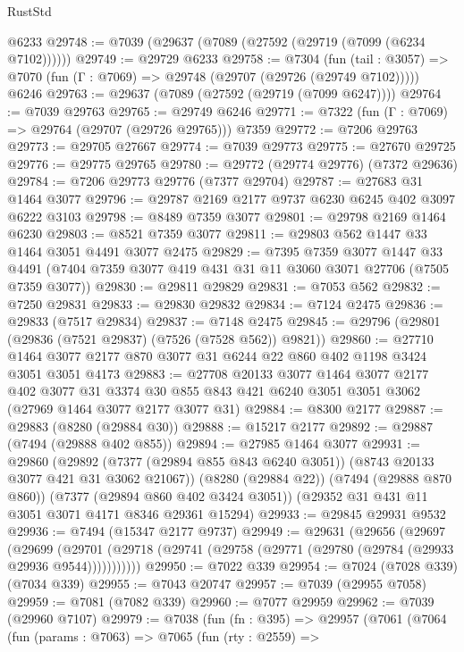 \begin{lexlean}{RustStd}
\begin{coremodule}
    @6233
@29748 := @7039 (@29637 (@7089 (@27592 (@29719 (@7099 (@6234 @7102))))))
@29749 := @29729 @6233
@29758 := @7304
    (fun (tail : @3057) => @7070 (fun (Γ : @7069) => @29748 (@29707 (@29726 (@29749 @7102)))))
    @6246
@29763 := @29637 (@7089 (@27592 (@29719 (@7099 @6247))))
@29764 := @7039 @29763
@29765 := @29749 @6246
@29771 := @7322 (fun (Γ : @7069) => @29764 (@29707 (@29726 @29765))) @7359
@29772 := @7206 @29763
@29773 := @29705 @27667
@29774 := @7039 @29773
@29775 := @27670 @29725
@29776 := @29775 @29765
@29780 := @29772 (@29774 @29776) (@7372 @29636)
@29784 := @7206 @29773 @29776 (@7377 @29704)
@29787 := @27683 @31 @1464 @3077
@29796 := @29787 @2169 @2177 @9737 @6230 @6245 @402 @3097 @6222 @3103
@29798 := @8489 @7359 @3077
@29801 := @29798 @2169 @1464 @6230
@29803 := @8521 @7359 @3077
@29811 := @29803 @562 @1447 @33 @1464 @3051 @4491 @3077 @2475
@29829 := @7395
    @7359
    @3077
    @1447
    @33
    @4491
    (@7404 @7359 @3077 @419 @431 @31 @11 @3060 @3071 @27706 (@7505 @7359 @3077))
@29830 := @29811 @29829
@29831 := @7053 @562
@29832 := @7250 @29831
@29833 := @29830 @29832
@29834 := @7124 @2475
@29836 := @29833 (@7517 @29834)
@29837 := @7148 @2475
@29845 := @29796 (@29801 (@29836 (@7521 @29837) (@7526 (@7528 @562)) @9821))
@29860 := @27710 @1464 @3077 @2177 @870 @3077 @31 @6244 @22 @860 @402 @1198 @3424 @3051 @3051 @4173
@29883 := @27708
    @20133
    @3077
    @1464
    @3077
    @2177
    @402
    @3077
    @31
    @3374
    @30
    @855
    @843
    @421
    @6240
    @3051
    @3051
    @3062
    (@27969 @1464 @3077 @2177 @3077 @31)
@29884 := @8300 @2177
@29887 := @29883 (@8280 (@29884 @30))
@29888 := @15217 @2177
@29892 := @29887 (@7494 (@29888 @402 @855))
@29894 := @27985 @1464 @3077
@29931 := @29860
    (@29892 (@7377 (@29894 @855 @843 @6240 @3051)) (@8743 @20133 @3077 @421 @31 @3062 @21067))
    (@8280 (@29884 @22))
    (@7494 (@29888 @870 @860))
    (@7377 (@29894 @860 @402 @3424 @3051))
    (@29352 @31 @431 @11 @3051 @3071 @4171 @8346 @29361 @15294)
@29933 := @29845 @29931 @9532
@29936 := @7494 (@15347 @2177 @9737)
@29949 := @29631
    (@29656
      (@29697
        (@29699
          (@29701 (@29718 (@29741 (@29758 (@29771 (@29780 (@29784 (@29933 @29936 @9544)))))))))))
@29950 := @7022 @339
@29954 := @7024 (@7028 @339) (@7034 @339)
@29955 := @7043 @20747
@29957 := @7039 (@29955 @7058)
@29959 := @7081 (@7082 @339)
@29960 := @7077 @29959
@29962 := @7039 (@29960 @7107)
@29979 := @7038
    (fun (fn : @395) =>
    @29957
      (@7061
        (@7064
          (fun (params : @7063) =>
          @7065
            (fun (rty : @2559) =>

\end{coremodule}
\end{lexlean}
